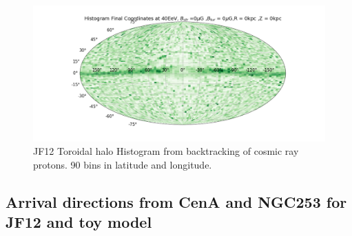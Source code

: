 \documentclass[12pt, a4 paper]{article}
\begin{document}
\begin{figure}[h!]
    \centering
    \includegraphics[width = 14cm]{Images/JF12_Proton_Final_Coordinates_Hist_Energy40_Bstr_0_Btur_0_R_0_Z_0.png}%
    \caption{\rm {JF12 Toroidal halo} Histogram from backtracking of cosmic ray protons. 90 bins in latitude and longitude.}
    \label{fig:my_label}
\end{figure}


\subsection{Arrival directions from CenA and NGC253 for JF12 and toy model}
\end{document}
